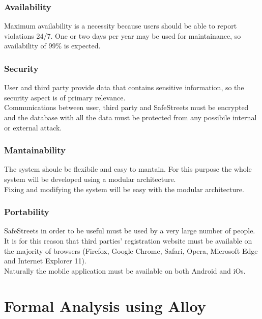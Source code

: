 \documentclass{article}
\begin{document}
\subsubsection{Availability}
Maximum availability is a necessity because users should be able to report
violations 24/7. One or two days per year may be used for maintainance, so
availability of 99\% is expected.
\subsubsection{Security}
User and third party provide data that contains sensitive information, so the
security aspect is of primary relevance.\\ Communications between user, third
party and SafeStreets must be encrypted and the database with all the data must
be protected from any possibile internal or external attack.
\subsubsection{Mantainability}
The system shoule be flexibile and easy to mantain. For this purpose the whole
system will be developed using a modular architecture. \\
Fixing and modifying the system will be easy with the modular architecture.

\subsubsection{Portability}
SafeStreets in order to be useful must be used by a very large number of people.
It is for this reason that third parties' registration website must be available
on the majority of browsers (Firefox, Google Chrome, Safari, Opera, Microsoft
Edge and Internet Explorer 11).\\
Naturally the mobile application must be available on both Android and iOs.

\newpage
\section{Formal Analysis using Alloy}


\newpage
\end{document}
